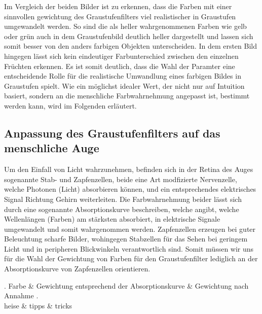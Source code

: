 \documentclass[course=erap]{aspdoc}
\begin{document}
	Im Vergleich der beiden Bilder ist zu erkennen, dass die Farben mit einer sinnvollen gewichtung des Graustufenfilters viel realistischer in Graustufen umgewandelt werden. So sind die als heller wahrgenommenen Farben wie gelb oder grün auch in dem Graustufenbild deutlich heller dargestellt und lassen sich somit besser von den anders farbigen Objekten unterscheiden. In dem ersten Bild hingegen lässt sich kein eindeutiger Farbunterschied zwischen den einzelnen Früchten erkennen. Es ist somit deutlich, dass die Wahl der Paramter eine entscheidende Rolle für die realistische Umwandlung eines farbigen Bildes in Graustufen spielt. Wie ein möglichst idealer Wert, der nicht nur auf Intuition basiert, sondern an die menschliche Farbwahrnehmung angepasst ist, bestimmt werden kann, wird im Folgenden erläutert.
\subsection{Anpassung des Graustufenfilters auf das menschliche Auge}
Um den Einfall von Licht wahrzunehmen, befinden sich in der Retina des Auges sogenannte Stab- und Zapfenzellen, beide eine Art modfizierte Nervenzelle, welche Photonen (Licht) absorbieren können, und ein entsprechendes elektrisches Signal Richtung Gehirn weiterleiten.
Die Farbwahrnehmung beider lässt sich durch eine sogenannte Absorptionskurve beschreiben, welche angibt, welche Wellenlängen (Farben) am stärksten absorbiert, in elektrische Signale umgewandelt und somit wahrgenommen werden.
Zapfenzellen erzeugen bei guter Beleuchtung scharfe Bilder, wohingegen Stabzellen für das Sehen bei geringem Licht und in peripheren Blickwinkeln verantwortlich sind. Somit müssen wir uns für die Wahl der Gewichtung von Farben für den Graustufenfilter lediglich an der Absorptionskurve von Zapfenzellen orientieren.
\begin{tabular}
.		Farbe & Gewichtung entsprechend der Absorptionskurve & Gewichtung nach Annahme . \\
	heise & tipps & tricks \\
\end{tabular}
\end{document}
